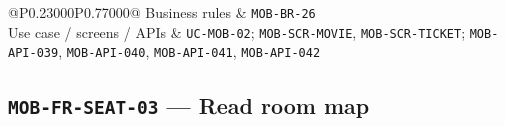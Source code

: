 \begin{longtable}{@{}P{0.23000\SRSWidth}P{0.77000\SRSWidth}@{}}
Business rules & \texttt{MOB-\allowbreak{}BR-\allowbreak{}26} \\[3pt]
Use case /\allowbreak{} screens /\allowbreak{} APIs & \texttt{UC-\allowbreak{}MOB-\allowbreak{}02}; \texttt{MOB-\allowbreak{}SCR-\allowbreak{}MOVIE}, \texttt{MOB-\allowbreak{}SCR-\allowbreak{}TICKET}; \texttt{MOB-\allowbreak{}API-\allowbreak{}039}, \texttt{MOB-\allowbreak{}API-\allowbreak{}040}, \texttt{MOB-\allowbreak{}API-\allowbreak{}041}, \texttt{MOB-\allowbreak{}API-\allowbreak{}042} \\[3pt]
\end{longtable}
\endgroup

\subsection{\texttt{MOB-\allowbreak{}FR-\allowbreak{}SEAT-\allowbreak{}03} — Read room map}
\begingroup
\fontsize{9.5}{12}\selectfont
\setlength{\SRSWidth}{\dimexpr\linewidth-2\tabcolsep\relax}
